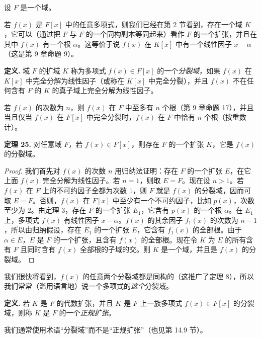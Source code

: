 设 $F$ 是一个域。

若 $f(x)$ 是 $F[x]$ 中的任意多项式，则我们已经在第 2 节看到，存在一个域 $K$，它可以（通过把 $F$ 与 $F$ 的一个同构副本等同起来）看作 $F$ 的一个扩张，并且在其中 $f(x)$ 有一个根 $\alpha$。这等价于说 $f(x)$ 在 $K[x]$ 中有一个线性因子 $x-\alpha$（这是第 9 章命题 9）。

\noindent\textbf{定义.} 域 $F$ 的扩域 $K$ 称为多项式 $f(x)\in F[x]$ 的一个\emph{分裂域}，如果 $f(x)$ 在 $K[x]$ 中完全分解为线性因子（或称在 $K[x]$ 中完全分裂），并且 $f(x)$ 不在任何含有 $F$ 的 $K$ 的真子域上完全分解为线性因子。


若 $f(x)$ 的次数为 $n$，则 $f(x)$ 在 $F$ 中至多有 $n$ 个根（第 9 章命题 17），并且当且仅当 $f(x)$ 在 $F[x]$ 中完全分裂时，$f(x)$ 在 $F$ 中恰有 $n$ 个根（按重数计）。

\noindent\textbf{定理 25.} 对任意域 $F$，若 $f(x)\in F[x]$，则存在 $F$ 的一个扩张 $K$，它是 $f(x)$ 的分裂域。


\begin{proof}
	我们首先对 $f(x)$ 的次数 $n$ 用归纳法证明：存在 $F$ 的一个扩张 $E$，在它上面 $f(x)$ 完全分解为线性因子。若 $n=1$，则取 $E=F$。现在设 $n>1$。若 $f(x)$ 在 $F$ 上的不可约因子全都为次数 $1$，则 $F$ 就是 $f(x)$ 的分裂域，因而可取 $E=F$。否则，$f(x)$ 在 $F[x]$ 中至少有一个不可约因子，比如 $p(x)$，次数至少为 $2$。由定理 3，存在 $F$ 的一个扩张 $E_1$，它含有 $p(x)$ 的一个根 $\alpha$。在 $E_1$ 上，多项式 $f(x)$ 有线性因子 $x-\alpha$。$f(x)$ 的其余因子 $f_1(x)$ 的次数为 $n-1$，所以由归纳假设，存在 $E_1$ 的一个扩张 $E$，它含有 $f_1(x)$ 的全部根。由于 $\alpha\in E$，$E$ 是 $F$ 的一个扩张，且含有 $f(x)$ 的全部根。现在令 $K$ 为 $E$ 的所有含有 $F$ 且同时含有 $f(x)$ 全部根的子域的交。则 $K$ 是一个域，并且是 $f(x)$ 的分裂域。
\end{proof}

我们很快将看到，$f(x)$ 的任意两个分裂域都是同构的（这推广了定理 8），所以我们常常（滥用语言地）说一个多项式的\emph{这个}分裂域。

\noindent\textbf{定义.} 若 $K$ 是 $F$ 的代数扩张，并且 $K$ 是 $F$ 上一族多项式 $f(x)\in F[x]$ 的分裂域，则称 $K$ 是 $F$ 的一个\emph{正规扩张}。


我们通常使用术语“分裂域”而不是“正规扩张”（也见第 14.9 节）。


